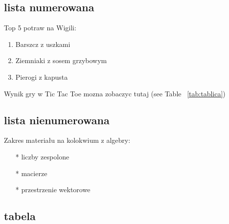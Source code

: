 \subsection*{lista numerowana}
Top 5 potraw na Wigili:
\begin{enumerate}
    \item Barszcz z uszkami
    \item Ziemniaki z sosem grzybowym
    \item Pierogi z kapusta
\end{enumerate}

\begin{flushleft}
\vspace{0.5cm}
Wynik gry w Tic Tac Toe mozna zobaczyc tutaj (see Table ~\ref{tab:tablica})
\vspace{0.5cm}
\end{flushleft}

\subsection*{lista nienumerowana}
Zakres materiału na kolokwium z algebry:
\begin{itemize}
  \item[*] liczby zespolone
  \item[*] macierze
  \item[*] przestrzenie wektorowe
\end{itemize}

\subsection*{tabela}
